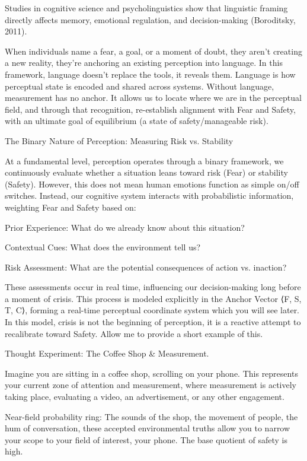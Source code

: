 \documentclass[11pt]{article}
\begin{document}
Studies in cognitive science and psycholinguistics show that linguistic framing directly affects memory, emotional regulation, and decision-making (Boroditsky, 2011).

When individuals name a fear, a goal, or a moment of doubt, they aren't creating a new reality, they’re anchoring an existing perception into language. In this framework, language doesn’t replace the tools, it reveals them. Language is how perceptual state is encoded and shared across systems. Without language, measurement has no anchor. It allows us to locate where we are in the perceptual field, and through that recognition, re-establish alignment with Fear and Safety, with an ultimate goal of equilibrium (a state of safety/manageable risk).

The Binary Nature of Perception: Measuring Risk vs. Stability

At a fundamental level, perception operates through a binary framework, we continuously evaluate whether a situation leans toward risk (Fear) or stability (Safety). However, this does not mean human emotions function as simple on/off switches. Instead, our cognitive system interacts with probabilistic information, weighting Fear and Safety based on:

Prior Experience: What do we already know about this situation?

Contextual Cues: What does the environment tell us?

Risk Assessment: What are the potential consequences of action vs. inaction?

These assessments occur in real time, influencing our decision-making long before a moment of crisis. This process is modeled explicitly in the Anchor Vector ⟨F, S, T, C⟩, forming a real-time perceptual coordinate system which you will see later. In this model, crisis is not the beginning of perception, it is a reactive attempt to recalibrate toward Safety. Allow me to provide a short example of this. 

Thought Experiment: The Coffee Shop & Measurement.

Imagine you are sitting in a coffee shop, scrolling on your phone. This represents your current zone of attention and measurement, where measurement is actively taking place, evaluating a video, an advertisement, or any other engagement.

Near-field probability ring: The sounds of the shop, the movement of people, the hum of conversation, these accepted environmental truths allow you to narrow your scope to your field of interest, your phone. The base quotient of safety is high. 
\end{document}
